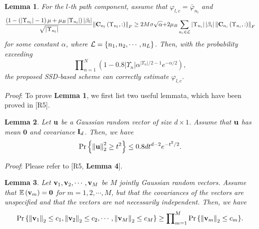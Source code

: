 \documentclass[a4paper,12pt]{article}
\begin{document}
{\begin{framed}
{\textbf{Lemma 1}. {\it For the ${l}$-th path component, assume that ${{\varphi _{l,c}} = {\bar \varphi _{{n_l}}}}$ and}
\begin{equation}\label{eq6}
\frac{{\left( {1 - \left( {\left| {{\Upsilon _{{n_l}}}} \right| - 1} \right)\mu  + {\mu _B}\left| {{\Upsilon _{{n_l}}}} \right|} \right)\left| {{\beta _l}} \right|}}{{\sqrt {\left| {{\Upsilon _{{n_l}}}} \right|} }}{\left\| {{{\bf{C}}_{{n_l}}}\left( {{\Upsilon _{{n_l}}},:} \right)} \right\|_F} \ge 2M\sigma \sqrt \alpha  {\rm{ + }}2{\mu _B}\sum\limits_{{n_i} \in {\cal L}} {\left| {{\Upsilon _{{n_i}}}} \right|\left| {{\beta _i}} \right|{{\left\| {{{\bf{C}}_{{n_i}}}\left( {{\Upsilon _{{n_i}}},:} \right)} \right\|}_F}}
\end{equation}
{\it for some constant ${\alpha}$, where ${{\cal L} = \left\{ {{n_1},{n_2}, \cdots ,{n_L}} \right\}}$. Then, with the probability exceeding}
\begin{equation}\label{eq7}
\prod\nolimits_{n = 1}^N {\left( {1 - 0.8\left| {{\Upsilon _n}} \right|{\alpha ^{\left| {{\Upsilon _n}} \right|/2 - 1}}{e^{ - \alpha /2}}} \right)},
\end{equation}
{\it the proposed SSD-based scheme can correctly estimate ${{\varphi _{l,c}}}$}.

{\it Proof}: To prove \textbf{Lemma 1}, we first list two useful lemmata, which have been proved in [R5].

\textbf{Lemma 2}. {\it Let ${{\bf{u}}}$ be a Gaussian random vector of size ${d \times 1}$. Assume that ${{\bf{u}}}$  has mean ${\mathbf{0}}$ and covariance ${{{\bf{I}}_d}}$. Then, we have}
\begin{equation}\label{eq8}
\Pr \left\{ {\left\| {\bf{u}} \right\|_2^2 \ge {t^2}} \right\} \le 0.8d{t^{d - 2}}{e^{ - {t^2}/2}}.
\end{equation}

{\it Proof}: Please refer to [R5, \textbf{Lemma 4}].


\textbf{Lemma 3}. {\it Let ${{{\bf{v}}_1},{{\bf{v}}_2}, \cdots ,{{\bf{v}}_M}}$ be ${M}$ jointly Gaussian random vectors. Assume that ${\mathbb{E}\left({{{\bf{v}}_m}} \right) = {\bf{0}}}$ for ${m = 1,2, \cdots ,M}$, but that the covariances of the vectors are unspecified and that the vectors are not necessarily independent. Then, we have}
\begin{equation}\label{eq9}
\Pr \left\{ {{{\left\| {{{\bf{v}}_1}} \right\|}_2} \le {c_1},{{\left\| {{{\bf{v}}_2}} \right\|}_2} \le {c_2}, \cdots ,{{\left\| {{{\bf{v}}_M}} \right\|}_2} \le {c_M}} \right\} \ge \prod\nolimits_{m = 1}^M {\Pr \left\{ {{{\left\| {{{\bf{v}}_m}} \right\|}_2} \le {c_m}} \right\}}.
\end{equation}

}
\end{framed}}
\end{document}
